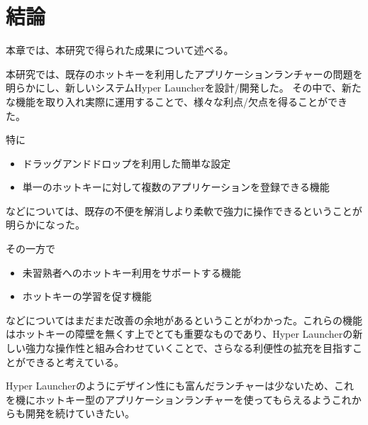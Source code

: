 \chapter{結論}
本章では、本研究で得られた成果について述べる。

\newpage

本研究では、既存のホットキーを利用したアプリケーションランチャーの問題を明らかにし、新しいシステムHyper Launcherを設計/開発した。
その中で、新たな機能を取り入れ実際に運用することで、様々な利点/欠点を得ることができた。

特に
\begin{itemize}
  \item ドラッグアンドドロップを利用した簡単な設定
  \item 単一のホットキーに対して複数のアプリケーションを登録できる機能
\end{itemize}
などについては、既存の不便を解消しより柔軟で強力に操作できるということが明らかになった。

その一方で
\begin{itemize}
  \item 未習熟者へのホットキー利用をサポートする機能
  \item ホットキーの学習を促す機能
\end{itemize}
などについてはまだまだ改善の余地があるということがわかった。これらの機能はホットキーの障壁を無くす上でとても重要なものであり、Hyper Launcherの新しい強力な操作性と組み合わせていくことで、さらなる利便性の拡充を目指すことができると考えている。

Hyper Launcherのようにデザイン性にも富んだランチャーは少ないため、これを機にホットキー型のアプリケーションランチャーを使ってもらえるようこれからも開発を続けていきたい。